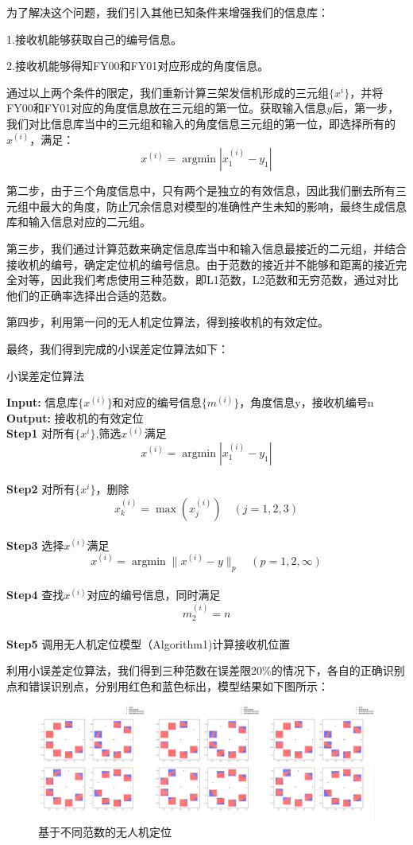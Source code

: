 \documentclass{my_paper}
\begin{document}
为了解决这个问题，我们引入其他已知条件来增强我们的信息库：

1.接收机能够获取自己的编号信息。

2.接收机能够得知FY00和FY01对应形成的角度信息。

通过以上两个条件的限定，我们重新计算三架发信机形成的三元组$\{x^{i}\}$，并将FY00和FY01对应的角度信息放在三元组的第一位。获取输入信息$y$后，第一步，我们对比信息库当中的三元组和输入的角度信息三元组的第一位，即选择所有的$x^{(i)}$，满足：$$x ^ { ( i ) } = \operatorname { argmin } | x ^ { ( i ) }_1 - y_1 |$$

第二步，由于三个角度信息中，只有两个是独立的有效信息，因此我们删去所有三元组中最大的角度，防止冗余信息对模型的准确性产生未知的影响，最终生成信息库和输入信息对应的二元组。

第三步，我们通过计算范数来确定信息库当中和输入信息最接近的二元组，并结合接收机的编号，确定定位机的编号信息。由于范数的接近并不能够和距离的接近完全对等，因此我们考虑使用三种范数，即L1范数，L2范数和无穷范数，通过对比他们的正确率选择出合适的范数。

第四步，利用第一问的无人机定位算法，得到接收机的有效定位。

最终，我们得到完成的小误差定位算法如下：
\begin{algorithm}[H]
\caption{\small 小误差定位算法}
\textbf{Input:} 信息库$\{x^{(i)}\}$和对应的编号信息$\{m^{(i)}\}$，角度信息y，接收机编号n\\
\textbf{Output:} 接收机的有效定位\\
\textbf{Step1} 对所有$\{x^{i}\}$,筛选$x^{(i)}$满足$$x ^ { ( i ) } = \operatorname { argmin } | x ^ { ( i ) }_1 - y_1 |$$\\
\textbf{Step2} 对所有$\{x^{i}\}$，删除$$x _ { k } ^ { ( i ) } = \max ( x _ { j } ^ { ( i ) } ) \quad ( j = 1,2,3 )$$\\
\textbf{Step3} 选择$x^{(i)}$满足$$x ^ { ( i ) } = \operatorname { argmin } \| x ^ { ( i ) } - y \| _  { p }\quad ( p = 1,2 , \infty )$$\\
\textbf{Step4} 查找$x^{(i)}$对应的编号信息，同时满足$$m^{(i)}_2=n$$\\
\textbf{Step5} 调用无人机定位模型（Algorithm1)计算接收机位置\\
\end{algorithm}

利用小误差定位算法，我们得到三种范数在误差限20\%的情况下，各自的正确识别点和错误识别点，分别用红色和蓝色标出，模型结果如下图所示：

\begin{figure}[H]
    \centering
    \includegraphics[width=1\textwidth]{two}
    \caption{基于不同范数的无人机定位} 
\end{figure}
\end{document}
